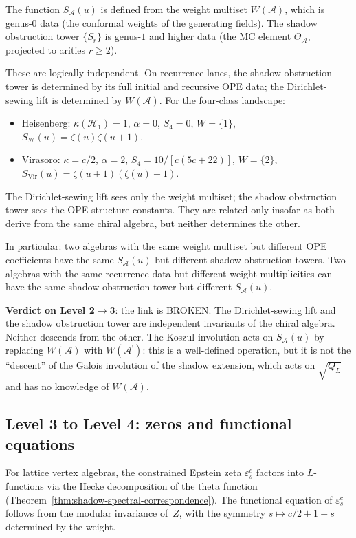 \documentclass[11pt]{article}
\newcommand{\cA}{\mathcal{A}}
\newcommand{\cH}{\mathcal{H}}
\begin{document}
\begin{warning}
\label{warn:dirichlet-not-shadow}
The function $S_\cA(u)$ is defined from the weight multiset
$W(\cA)$, which is genus-$0$ data (the conformal weights of
the generating fields).  The shadow obstruction tower $\{S_r\}$ is genus-$1$
and higher data (the MC element $\Theta_\cA$, projected to arities
$r \geq 2$).

These are logically independent.  On recurrence lanes, the shadow
obstruction tower is determined by its full initial and recursive
OPE data; the Dirichlet-sewing lift is determined by $W(\cA)$.  For
the four-class landscape:
\begin{itemize}[nosep]
\item Heisenberg: $\kappa(\cH_1) = 1$, $\alpha = 0$,
  $S_4 = 0$, $W = \{1\}$, $S_\cH(u) = \zeta(u)\zeta(u{+}1)$.
\item Virasoro: $\kappa = c/2$, $\alpha = 2$,
  $S_4 = 10/[c(5c{+}22)]$, $W = \{2\}$,
  $S_{\mathrm{Vir}}(u) = \zeta(u{+}1)(\zeta(u) - 1)$.
\end{itemize}
The Dirichlet-sewing lift sees only the weight multiset; the
shadow obstruction tower sees the OPE structure constants.  They are
related only insofar as both derive from the same chiral
algebra, but neither determines the other.

In particular: two algebras with the same weight multiset
but different OPE coefficients have the same $S_\cA(u)$ but
different shadow obstruction towers.  Two algebras with the same
recurrence data but different weight multiplicities can have the
same shadow obstruction tower but different $S_\cA(u)$.
\end{warning}

\textbf{Verdict on Level 2$\to$3}: the link is BROKEN.  The
Dirichlet-sewing lift and the shadow obstruction tower are independent invariants
of the chiral algebra.  Neither descends from the other.  The Koszul
involution acts on $S_\cA(u)$ by replacing $W(\cA)$ with $W(\cA^!)$:
this is a well-defined operation, but it is not the ``descent'' of
the Galois involution of the shadow extension, which acts on
$\sqrt{Q_L}$ and has no knowledge of $W(\cA)$.

\subsection{Level 3 to Level 4: zeros and functional equations}

For lattice vertex algebras, the constrained Epstein zeta
$\varepsilon^c_s$ factors into $L$-functions via the Hecke
decomposition of the theta function
(Theorem~\ref{thm:shadow-spectral-correspondence}).  The
functional equation of $\varepsilon^c_s$ follows from the
modular invariance of~$Z$, with the symmetry
$s \mapsto c/2 + 1 - s$ determined by the weight.
\end{document}
